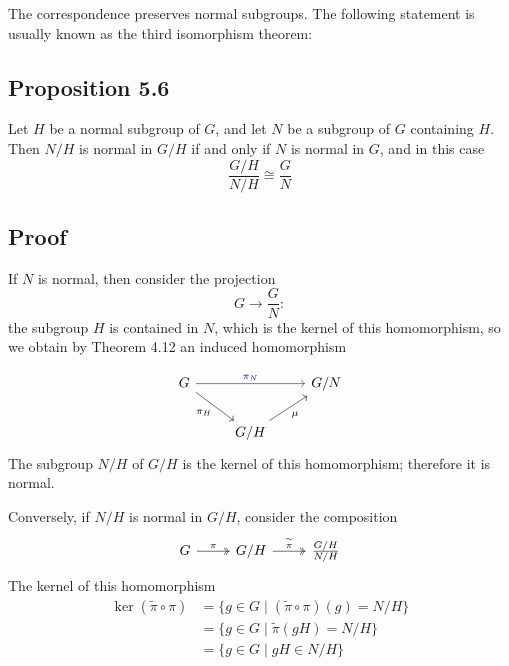 \vspace{2em}

\noindent The correspondence preserves normal subgroups. The following statement is usually known as the \color{red}third isomorphism theorem\color{black}:
\subsection*{\color{blue}Proposition 5.6}
Let $H$ be a normal subgroup of $G$, and let $N$ be a subgroup of $G$ containing $H$. Then $N/H$ is normal in $G/H$ if and only if $N$ is normal in $G$, and in this case
$$\frac{G/H}{N/H} \cong \frac{G}{N}$$

\color{black}
\subsection*{Proof}
If $N$ is normal, then consider the projection
$$G \longrightarrow \frac{G}{N}:$$
the subgroup $H$ is contained in $N$, which is the kernel of this homomorphism, so we obtain by Theorem 4.12 an induced homomorphism
\vspace{8em}


\[
\begin{tikzcd}
G \arrow[rd, "\pi_H"'] \arrow[rr, "\pi_N", blue] &  & G/N \\
 & G/H \arrow[ru, "\mu"'] &
\end{tikzcd}
\]
\noindent The subgroup $N/H$ of $G/H$ is the kernel of this homomorphism; therefore it is normal.

Conversely, if $N/H$ is normal in $G/H$, consider the composition
\[
\begin{tikzcd}
G \arrow[r, "\pi", two heads] & G/H \arrow[r, "\widetilde{\pi}", two heads] & \frac{G/H}{N/H}
\end{tikzcd}
\]
The kernel of this homomorphism
\begin{align*}
\ker(\widetilde{\pi} \circ \pi) &= \{ g \in G \mid (\widetilde{\pi} \circ \pi)(g) = N/H \} \\
&= \{ g \in G \mid \widetilde{\pi}(gH) = N/H \} \\
&= \{ g \in G \mid gH \in N/H \}
\end{align*}


